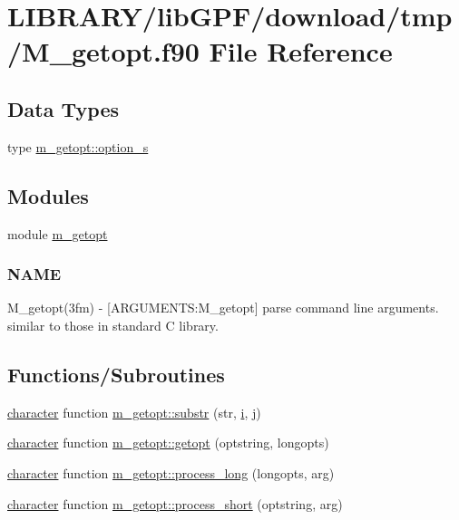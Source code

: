 \hypertarget{M__getopt_8f90}{}\section{L\+I\+B\+R\+A\+R\+Y/lib\+G\+P\+F/download/tmp/\+M\+\_\+getopt.f90 File Reference}
\label{M__getopt_8f90}
\subsection*{Data Types}
\begin{DoxyCompactItemize}
\item 
type \hyperlink{structm__getopt_1_1option__s}{m\+\_\+getopt\+::option\+\_\+s}
\end{DoxyCompactItemize}
\subsection*{Modules}
\begin{DoxyCompactItemize}
\item 
module \hyperlink{namespacem__getopt}{m\+\_\+getopt}
\begin{DoxyCompactList}\small\item\em \subsubsection*{N\+A\+ME}

M\+\_\+getopt(3fm) -\/ \mbox{[}A\+R\+G\+U\+M\+E\+N\+TS\+:M\+\_\+getopt\mbox{]} parse command line arguments. similar to those in standard C library. \end{DoxyCompactList}\end{DoxyCompactItemize}
\subsection*{Functions/\+Subroutines}
\begin{DoxyCompactItemize}
\item 
\hyperlink{option__stopwatch_83_8txt_abd4b21fbbd175834027b5224bfe97e66}{character} function \hyperlink{namespacem__getopt_a20145e0f477d81541fbe9b408f2194d0}{m\+\_\+getopt\+::substr} (str, \hyperlink{intro__blas1_83_8txt_a8ba82a50c0c2c12d5f6a77f7e4651c0b}{i}, \hyperlink{exit_87_8txt_a8921ef29c441e427867c54bd3b2462ba}{j})
\item 
\hyperlink{option__stopwatch_83_8txt_abd4b21fbbd175834027b5224bfe97e66}{character} function \hyperlink{namespacem__getopt_a00e4c1d7d61539e0bdf63a6ee13284d2}{m\+\_\+getopt\+::getopt} (optstring, longopts)
\item 
\hyperlink{option__stopwatch_83_8txt_abd4b21fbbd175834027b5224bfe97e66}{character} function \hyperlink{namespacem__getopt_a47714553b3cda11df4d21bc343760d9c}{m\+\_\+getopt\+::process\+\_\+long} (longopts, arg)
\item 
\hyperlink{option__stopwatch_83_8txt_abd4b21fbbd175834027b5224bfe97e66}{character} function \hyperlink{namespacem__getopt_a5a41350043ae3b92dbbac7dea6702e09}{m\+\_\+getopt\+::process\+\_\+short} (optstring, arg)
\end{DoxyCompactItemize}

